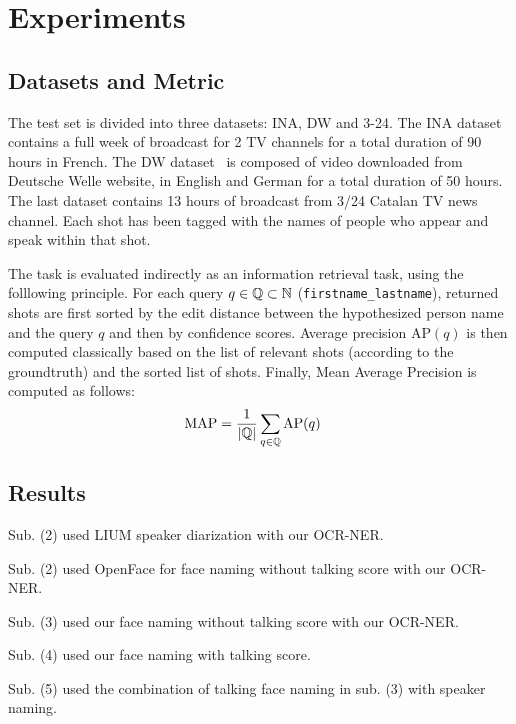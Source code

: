\section{Experiments}
\label{sec:experiment}
%
\subsection{Datasets and Metric}

The test set is divided into three datasets: INA, DW and 3-24. The INA dataset contains a full week of broadcast for 2 TV channels for a total duration of 90 hours in French. The DW dataset~\cite{EUMSSI} is composed of video downloaded from Deutsche Welle website, in English and German for a total duration of 50 hours. The last dataset contains 13 hours of broadcast from 3/24 Catalan TV news channel. Each shot has been tagged with the names of people who appear and speak within that shot.

The task is evaluated indirectly as an information retrieval task, using the folllowing principle.
%
For each query $q \in \mathbb{Q} \subset \mathbb{N}$ (\texttt{first\-name\_lastname}), returned shots are first sorted by the edit distance between the hypothesized person name and the query $q$ and then by confidence scores.
Average precision $\text{AP}(q)$ is then computed classically based on the list of relevant shots (according to the groundtruth) and the sorted list of shots. Finally, Mean Average Precision is computed as follows:
\begin{align}
            \text{MAP} & = \frac{1}{|\mathbb{Q}|} \sum_{q \in \mathbb{Q}} \text{AP}(q) \nonumber
\end{align}

\subsection{Results}

\begin{compactitem}
  \item Sub. (2) used LIUM speaker diarization with our OCR-NER.
  \item Sub. (2) used OpenFace for face naming without talking score with our OCR-NER.
	\item Sub. (3) used our face naming without talking score with our OCR-NER.
	\item Sub. (4) used our face naming with talking score. 
	\item Sub. (5) used the combination of talking face naming in sub. (3) with speaker naming.
\end{compactitem}

